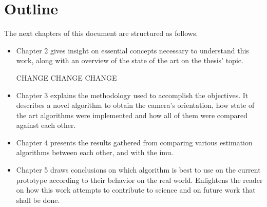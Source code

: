  		
\section{Outline}
\label{cha1:outline}

The next chapters of this document are structured as follows.
\begin{itemize}
\item	Chapter 2 gives insight on essential concepts necessary to understand this work, along with an overview of the state of the art on the thesis' topic.
	
CHANGE CHANGE CHANGE
	
\item	Chapter 3 explains the methodology used to accomplish the objectives. It describes a novel algorithm to obtain the camera's orientation, how state of the art algorithms were implemented and how all of them were compared against each other. 
	
\item	Chapter 4 presents the results gathered from comparing various estimation algorithms between each other, and with the \acrshort{imu}.
	
\item	Chapter 5 draws conclusions on which algorithm is best to use on the current prototype according to their behavior on the real world. Enlightens the reader on how this work attempts to contribute to science and on future work that shall be done.
	

	
\end{itemize}



